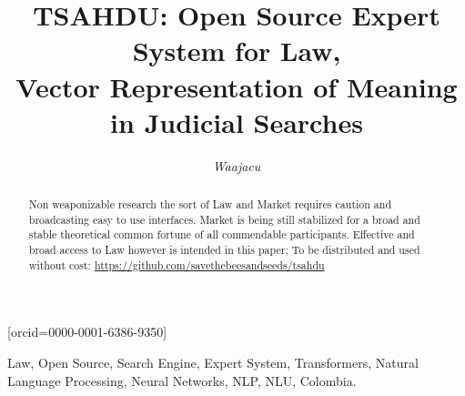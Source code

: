 \documentclass[a4paper,fleqn]{cas-sc}
\begin{document}
\let\WriteBookmarks\relax
\def\floatpagepagefraction{1}
\def\textpagefraction{.001}

\title[mode = title]{TSAHDU: Open Source Expert System for Law, \\Vector Representation of Meaning in Judicial Searches}




  \author[1]{\textit{Waajacu}}[orcid=0000-0001-6386-9350]
  \cormark[1] 


  \address[1]{Santiago Restrepo Ruiz, Colombia.}





\begin{abstract}
  Non weaponizable research the sort of Law and Market requires caution and broadcasting easy to use interfaces. 
  Market is being still stabilized for a broad and stable theoretical common fortune of all commendable participants. 
  Effective and broad access to Law however is intended in this paper; To be distributed and used without cost: 
  \href{https://github.com/savethebeesandseeds/tsahdu}{https://github.com/savethebeesandseeds/tsahdu}
  
\end{abstract}
 \begin{keywords}
  Law, Open Source, Search Engine, Expert System, Transformers, Natural Language Processing, Neural Networks, NLP, NLU, Colombia. 
 \end{keywords}
\end{document}
